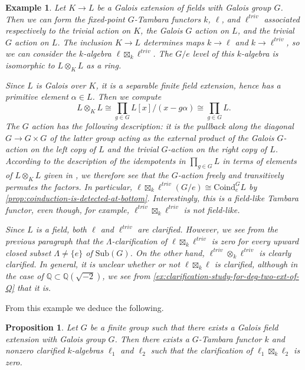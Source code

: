 \documentclass[11pt,dvipsnames]{amsart}
\newcommand{\Q}{\mathbb{Q}}
\newtheorem{proposition}[theorem]{Proposition}
\theoremstyle{BoldRemark}
\newtheorem{example}[theorem]{Example}
\begin{document}
\begin{example}
	Let $K \rightarrow L$ be a Galois extension of fields with Galois group $G$. Then we can form the fixed-point $G$-Tambara functors $k$, $\ell$, and $\ell^{triv}$ associated respectively to the trivial action on $K$, the Galois $G$ action on $L$, and the trivial $G$ action on $L$. The inclusion $K \rightarrow L$ determines maps $k \rightarrow \ell$ and $k \rightarrow \ell^{triv}$, so we can consider the $k$-algebra $\ell \boxtimes_k \ell^{triv}$. The $G/e$ level of this $k$-algebra is isomorphic to $L \otimes_K L$ as a ring.
	
	Since $L$ is Galois over $K$, it is a separable finite field extension, hence has a primitive element $\alpha \in L$. Then we compute 
\[ 
	L \otimes_K L \cong \prod_{g \in G} L[x]/(x-g \alpha) \cong \prod_{g \in G} L .
\] 
The $G$ action has the following description: it is the pullback along the diagonal $G \rightarrow G \times G$ of the latter group acting as the external product of the Galois $G$-action on the left copy of $L$ and the trivial $G$-action on the right copy of $L$. According to the description of the idempotents in $\prod_{g \in G} L$ in terms of elements of $L \otimes_K L$ given in \cite{Vij21}, we therefore see that the $G$-action freely and transitively permutes the factors. In particular, $\ell \boxtimes_k \ell^{triv}(G/e) \cong \mathrm{Coind}_e^G L$ by \cref{prop:coinduction-is-detected-at-bottom}. Interestingly, this is a field-like Tambara functor, even though, for example, $\ell^{triv} \boxtimes_k \ell^{triv}$ is not field-like.
	
	Since $L$ is a field, both $\ell$ and $\ell^{triv}$ are clarified. However, we see from the previous paragraph that the $\Lambda$-clarification of $\ell \boxtimes_k \ell^{triv}$ is zero for every upward closed subset $\Lambda \neq \{ e \}$ of $\mathrm{Sub}(G)$. On the other hand, $\ell^{triv} \otimes_k \ell^{triv}$ is clearly clarified. In general, it is unclear whether or not $\ell \boxtimes_k \ell$ is clarified, although in the case of $\Q \subset \Q(\sqrt{-2})$, we see from \cref{ex:clarification-study-for-deg-two-ext-of-Q} that it is.
\end{example}

From this example we deduce the following.

\begin{proposition}\label{prop:box-product-of-clarified-is-not-clarified}
	Let $G$ be a finite group such that there exists a Galois field extension with Galois group $G$. Then there exists a $G$-Tambara functor $k$ and nonzero clarified $k$-algebras $\ell_1$ and $\ell_2$ such that the clarification of $\ell_1 \boxtimes_k \ell_2$ is zero.
\end{proposition}
\end{document}
